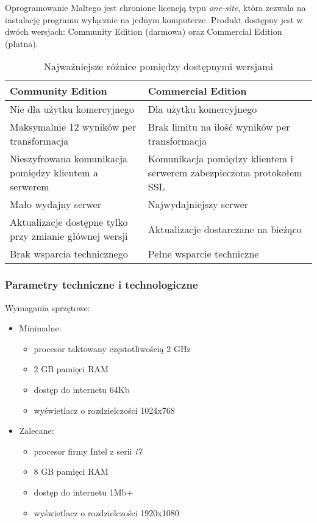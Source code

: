 \documentclass[11pt,a4paper]{article}
\begin{document}
Oprogramowanie Maltego jest chronione licencją typu \emph{one-site}, która zezwala na instalację programu wyłącznie na jednym komputerze. Produkt dostępny jest w dwóch wersjach: Community Edition (darmowa) oraz Commercial Edition (płatna).\\

\begin{table}[H]
	\centering
	\begin{tabular}{ | p{6cm}| p{6cm} | }
    	\hline
    	\textbf{Community Edition} & \textbf{Commercial Edition}\\ \hline
    	Nie dla użytku komercyjnego & Dla użytku komercyjnego \\ \hline
    	Maksymalnie 12 wyników per transformacja & Brak limitu na ilość wyników per transformacja \\ \hline
    	Nieszyfrowana komunikacja pomiędzy klientem a serwerem & Komunikacja pomiędzy klientem i serwerem zabezpieczona protokołem SSL \\ \hline
    	Mało wydajny serwer & Najwydajniejszy serwer \\ \hline
    	Aktualizacje dostępne tylko przy zmianie głównej wersji & Aktualizacje dostarczane na bieżąco \\ \hline
    	Brak wsparcia technicznego & Pełne wsparcie techniczne \\
    	\hline
  	\end{tabular}
  	\caption*{Najważniejsze różnice pomiędzy dostępnymi wersjami}
\end{table}

\subsubsection*{Parametry techniczne i technologiczne}

Wymagania sprzętowe:
\begin{itemize}
	\item Minimalne:
		\begin{itemize}
			\item procesor taktowany częstotliwością 2 GHz
    		\item 2 GB pamięci RAM
    		\item dostęp do internetu 64Kb
    		\item wyświetlacz o rozdzielczości 1024x768
		\end{itemize}
	\item Zalecane: 
		\begin{itemize}
			\item procesor firmy Intel z serii \emph{i7}
    		\item 8 GB pamięci RAM
    		\item dostęp do internetu 1Mb+
    		\item wyświetlacz o rozdzielczości 1920x1080
		\end{itemize}
\end{itemize}
\end{document}
